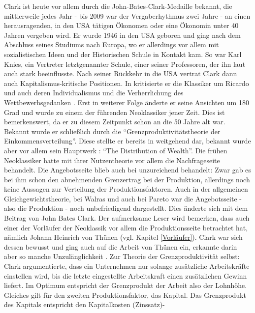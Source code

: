 Clark ist heute vor allem durch die John-Bates-Clark-Medaille bekannt, die mittlerweile jedes Jahr - bis 2009 war der Vergaberhythmus zwei Jahre - an einen herausragenden, in den USA tätigen Ökonomen oder eine Ökonomin unter 40 Jahren vergeben wird. Er wurde 1946 in den USA geboren und ging nach dem Abschluss seines Studiums nach Europa, wo er allerdings vor allem mit sozialistischen Ideen und der Historischen Schule in Kontakt kam. So war Karl Knies, ein Vertreter letztgenannter Schule, einer seiner Professoren, der ihn laut \textcite{Tobin1985} auch stark beeinflusste. Nach seiner Rückkehr in die USA vertrat Clark dann auch Kapitalismus-kritische Positionen. In \textcite{Clark1886} kritisierte er die Klassiker um Ricardo und auch deren Individualismus und die Verherrlichung des Wettbewerbsgedanken \parencite[S. 29]{Tobin1985}. Erst in weiterer Folge änderte er seine Ansichten um 180 Grad und wurde zu einem der führenden Neoklassiker jener Zeit. Dies ist bemerkenswert, da er zu diesem Zeitpunkt schon an die 50 Jahre alt war. Bekannt wurde er schließlich durch die "`Grenzproduktivitätstheorie der Einkommensverteilung"'. Diese stellte er bereits in \textcite{Clark1891} weitgehend dar, bekannt wurde aber vor allem sein Hauptwerk \textcite{Clark1899}: "`The Distribution of Wealth"'. Die frühen Neoklassiker hatte mit ihrer Nutzentheorie vor allem die Nachfrageseite behandelt. Die Angebotsseite blieb auch bei \textcite{Marshall1890} unzureichend behandelt: Zwar gab es bei ihm schon den abnehmenden Grenzertrag bei der Produktion, allerdings noch keine Aussagen zur Verteilung der Produktionsfaktoren. Auch in der allgemeinen Gleichgewichtstheorie, bei Walras und auch bei Pareto war die Angebotsseite - also die Produktion - noch unbefriedigend dargestellt. Dies änderte sich mit dem Beitrag von John Bates Clark. Der aufmerksame Leser wird bemerken, dass auch einer der Vorläufer der Neoklassik vor allem die Produktionsseite betrachtet hat, nämlich Johann Heinrich von Thünen (vgl. Kapitel \ref{Vorläufer}). Clark war sich dessen bewusst und ging auch auf die Arbeit von Thünen ein, erkannte darin aber so manche Unzulänglichkeit \parencite[S. 31]{Tobin1985}. Zur Theorie der Grenzproduktivität selbst: Clark argumentierte, dass ein Unternehmen nur solange zusätzliche Arbeitskräfte einstellen wird, bis die letzte eingestellte Arbeitskraft einen zusätzlichen Gewinn liefert. Im Optimum entspricht der Grenzprodukt der Arbeit also der Lohnhöhe. Gleiches gilt für den zweiten Produktionsfaktor, das Kapital. Das Grenzprodukt des Kapitals entspricht den Kapitalkosten (Zinssatz)- 

